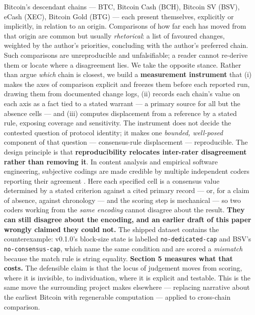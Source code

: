 \documentclass[
]{article}
\begin{document}
Bitcoin's descendant chains --- BTC, Bitcoin Cash (BCH), Bitcoin SV
(BSV), eCash (XEC), Bitcoin Gold (BTG) --- each present themselves,
explicitly or implicitly, in relation to an origin. Comparisons of how
far each has moved from that origin are common but usually
\emph{rhetorical}: a list of favoured changes, weighted by the author's
priorities, concluding with the author's preferred chain. Such
comparisons are unreproducible and unfalsifiable; a reader cannot
re-derive them or locate where a disagreement lies. We take the opposite
stance. Rather than argue \emph{which} chain is closest, we build a
\textbf{measurement instrument} that (i) makes the axes of comparison
explicit and freezes them before each reported run, drawing them from
documented change logs, (ii) records each chain's value on each axis as
a fact tied to a stated warrant --- a primary source for all but the
absence cells --- and (iii) computes displacement from a reference by a
stated rule, exposing coverage and sensitivity. The instrument does not
decide the contested question of protocol identity; it makes one
\emph{bounded, well-posed} component of that question --- consensus-rule
displacement --- reproducible. The design principle is that
\textbf{reproducibility relocates inter-rater disagreement rather than
removing it}. In content analysis and empirical software engineering,
subjective codings are made credible by multiple independent coders
reporting their agreement \citep{krippendorff, easterbrook}. Here each
specified cell is a consensus value determined by a stated criterion
against a cited primary record --- or, for a claim of absence, against
chronology --- and the scoring step is mechanical --- so two coders
working from the \emph{same encoding} cannot disagree about the result.
\textbf{They can still disagree about the encoding, and an earlier draft
of this paper wrongly claimed they could not.} The shipped dataset
contains the counterexample: v0.1.0's block-size state is labelled
\texttt{no-dedicated-cap} and BSV's \texttt{no-consensus-cap}, which
name the same condition and are scored a \emph{mismatch} because the
match rule is string equality. \textbf{Section 5 measures what that
costs.} The defensible claim is that the locus of judgement moves from
scoring, where it is invisible, to individuation, where it is explicit
and testable. This is the same move the surrounding project makes
elsewhere --- replacing narrative about the earliest Bitcoin with
regenerable computation \citep{saxena_beforegenesis, saxena_ledger} ---
applied to cross-chain comparison.
\end{document}
